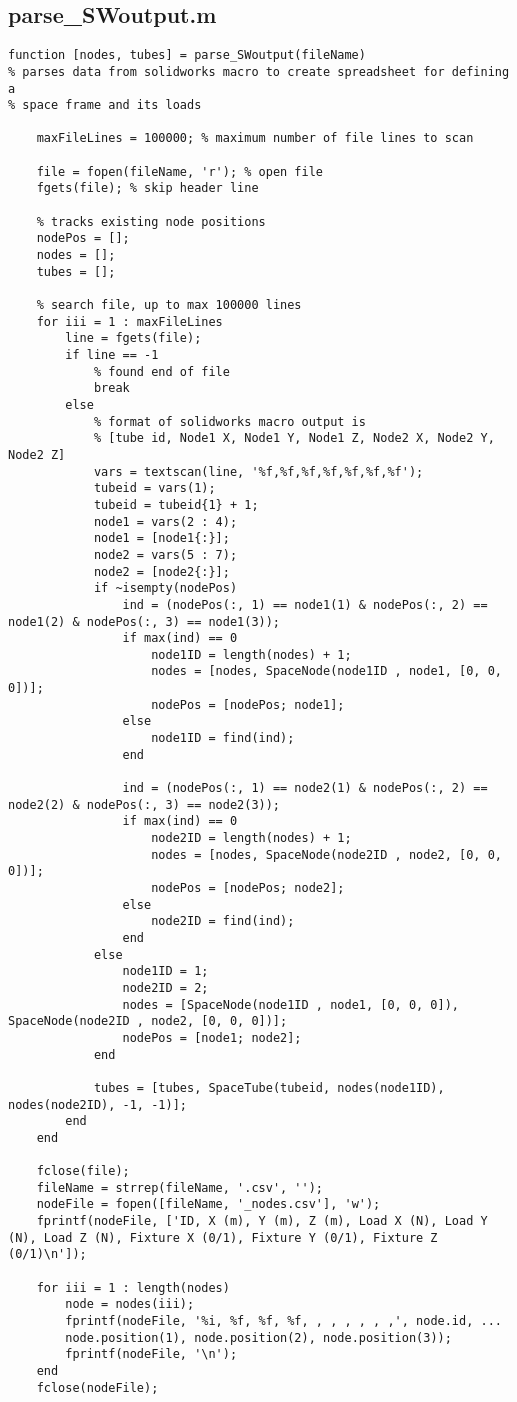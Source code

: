 		\subsection{parse\_SWoutput.m}
\begin{lstlisting}
function [nodes, tubes] = parse_SWoutput(fileName)
% parses data from solidworks macro to create spreadsheet for defining a
% space frame and its loads

	maxFileLines = 100000; % maximum number of file lines to scan
	
	file = fopen(fileName, 'r'); % open file
	fgets(file); % skip header line
	
	% tracks existing node positions
	nodePos = [];
	nodes = [];
	tubes = [];
	
	% search file, up to max 100000 lines
	for iii = 1 : maxFileLines
		line = fgets(file);
		if line == -1
			% found end of file
			break
		else
			% format of solidworks macro output is
			% [tube id, Node1 X, Node1 Y, Node1 Z, Node2 X, Node2 Y, Node2 Z]
			vars = textscan(line, '%f,%f,%f,%f,%f,%f,%f');
			tubeid = vars(1);
			tubeid = tubeid{1} + 1;
			node1 = vars(2 : 4);
			node1 = [node1{:}];
			node2 = vars(5 : 7);
			node2 = [node2{:}];
			if ~isempty(nodePos)
				ind = (nodePos(:, 1) == node1(1) & nodePos(:, 2) == node1(2) & nodePos(:, 3) == node1(3));
				if max(ind) == 0
					node1ID = length(nodes) + 1;
					nodes = [nodes, SpaceNode(node1ID , node1, [0, 0, 0])];
					nodePos = [nodePos; node1];
				else
					node1ID = find(ind);
				end
			
				ind = (nodePos(:, 1) == node2(1) & nodePos(:, 2) == node2(2) & nodePos(:, 3) == node2(3));
				if max(ind) == 0
					node2ID = length(nodes) + 1;
					nodes = [nodes, SpaceNode(node2ID , node2, [0, 0, 0])];
					nodePos = [nodePos; node2];
				else
					node2ID = find(ind);
				end
			else
				node1ID = 1;
				node2ID = 2;
				nodes = [SpaceNode(node1ID , node1, [0, 0, 0]), SpaceNode(node2ID , node2, [0, 0, 0])];
				nodePos = [node1; node2];
			end
		
			tubes = [tubes, SpaceTube(tubeid, nodes(node1ID), nodes(node2ID), -1, -1)];
		end
	end
	
	fclose(file);
	fileName = strrep(fileName, '.csv', '');
	nodeFile = fopen([fileName, '_nodes.csv'], 'w');
	fprintf(nodeFile, ['ID, X (m), Y (m), Z (m), Load X (N), Load Y (N), Load Z (N), Fixture X (0/1), Fixture Y (0/1), Fixture Z (0/1)\n']);
	
	for iii = 1 : length(nodes)
		node = nodes(iii);
		fprintf(nodeFile, '%i, %f, %f, %f, , , , , , ,', node.id, ...
		node.position(1), node.position(2), node.position(3));
		fprintf(nodeFile, '\n');
	end
	fclose(nodeFile);
	

\end{lstlisting}
